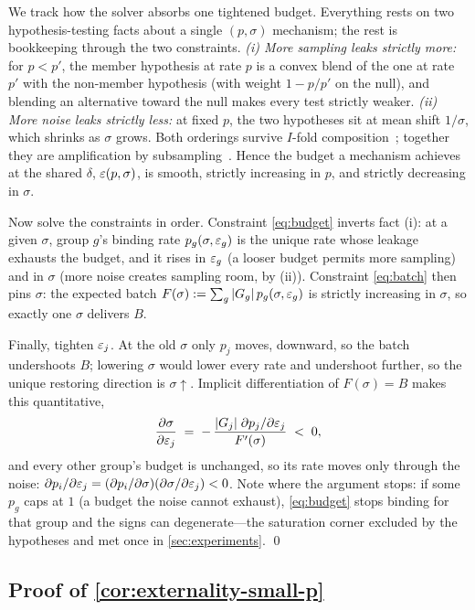 We track how the solver absorbs one tightened budget. Everything rests
on two hypothesis-testing facts about a single $(p,\sigma)$
mechanism; the rest is bookkeeping through the two constraints.
\emph{(i) More sampling leaks strictly more:} for $p < p'$, the
member hypothesis at rate $p$ is a convex blend of the one at rate
$p'$ with the non-member hypothesis (with weight $1 - p/p'$ on the
null), and blending an alternative toward the null makes every test
strictly weaker. \emph{(ii) More noise leaks strictly less:} at fixed
$p$, the two hypotheses sit at mean shift $1/\sigma$, which shrinks
as $\sigma$ grows. Both orderings survive $I$-fold
composition~\cite{dong2022gaussian}; together they are amplification
by subsampling~\cite{balle2020privacy}. Hence the budget a mechanism
achieves at the shared $\delta$, $\varepsilon(p, \sigma)$, is smooth,
strictly increasing in $p$, and strictly decreasing in $\sigma$.

Now solve the constraints in order. Constraint \eqref{eq:budget} inverts fact (i): at a
given $\sigma$, group $g$'s binding rate $p_g(\sigma, \varepsilon_g)$ is
the unique rate whose leakage exhausts the budget, and it rises in
$\varepsilon_g$ (a looser budget permits more sampling) and in $\sigma$
(more noise creates sampling room, by (ii)). Constraint \eqref{eq:batch} then pins
$\sigma$: the expected batch $F(\sigma) := \sum_g |G_g|\,
p_g(\sigma, \varepsilon_g)$ is strictly increasing in $\sigma$, so exactly
one $\sigma$ delivers $B$.

Finally, tighten $\varepsilon_j$. At the old $\sigma$ only $p_j$ moves,
downward, so the batch undershoots $B$; lowering $\sigma$ would
lower every rate and undershoot further, so the unique restoring
direction is $\sigma \uparrow$. Implicit differentiation of
$F(\sigma) = B$
makes this quantitative,
\[
\frac{\partial \sigma}{\partial \varepsilon_j}
\;=\; -\,\frac{|G_j|\; \partial p_j / \partial \varepsilon_j}{F'(\sigma)}
\;<\; 0 ,
\]
and every other group's budget is unchanged, so its rate moves only
through the noise: $\partial p_i / \partial \varepsilon_j = (\partial p_i /
\partial \sigma)(\partial \sigma / \partial \varepsilon_j) < 0$. Note where
the argument stops: if some $p_g$ caps at $1$ (a budget the noise
cannot exhaust), \eqref{eq:budget} stops binding for that group and the signs
can degenerate---the saturation corner excluded by the hypotheses
and met once in \cref{sec:experiments}. \qed

\subsection{Proof of \texorpdfstring{\cref{cor:externality-small-p}}{the small-p corollary}}


